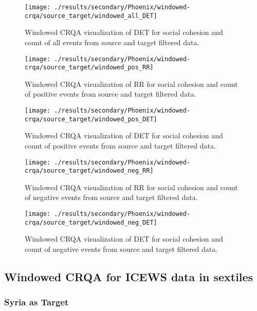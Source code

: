 \documentclass[english,man]{apa6}
\begin{document}
\begin{figure}
\texttt{[image: ./results/secondary/Phoenix/windowed-crqa/source\_target/windowed\_all\_DET]} \caption{Windowed CRQA visualization of DET for social cohesion and count of all events from source and target filtered data.}\label{fig:plot-DET-source-targ-all-secondary-Phoenix}
\end{figure}

\begin{figure}
\texttt{[image: ./results/secondary/Phoenix/windowed-crqa/source\_target/windowed\_pos\_RR]} \caption{Windowed CRQA visualization of RR for social cohesion and count of positive events from source and target filtered data.}\label{fig:plot-RR-source-targ-pos-secondary-Phoenix}
\end{figure}

\begin{figure}
\texttt{[image: ./results/secondary/Phoenix/windowed-crqa/source\_target/windowed\_pos\_DET]} \caption{Windowed CRQA visualization of DET for social cohesion and count of positive events from source and target filtered data.}\label{fig:plot-DET-source-targ-pos-secondary-Phoenix}
\end{figure}

\begin{figure}
\texttt{[image: ./results/secondary/Phoenix/windowed-crqa/source\_target/windowed\_neg\_RR]} \caption{Windowed CRQA visualization of RR for social cohesion and count of negative events from source and target filtered data.}\label{fig:plot-RR-source-targ-neg-secondary-Phoenix}
\end{figure}

\begin{figure}
\texttt{[image: ./results/secondary/Phoenix/windowed-crqa/source\_target/windowed\_neg\_DET]} \caption{Windowed CRQA visualization of DET for social cohesion and count of negative events from source and target filtered data.}\label{fig:plot-DET-source-targ-neg-secondary-Phoenix}
\end{figure}

\hypertarget{windowed-crqa-for-icews-data-in-sextiles}{%
\subsection{Windowed CRQA for ICEWS data in sextiles}\label{windowed-crqa-for-icews-data-in-sextiles}}

\hypertarget{syria-as-target-5}{%
\subsubsection{Syria as Target}\label{syria-as-target-5}}
\end{document}

